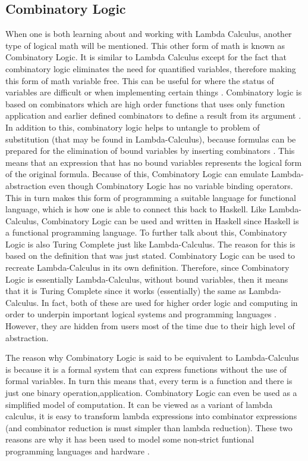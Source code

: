 \documentclass{article}
\begin{document}
\subsection{Combinatory Logic}
When one is both learning about and working with Lambda Calculus, another type of logical math will be mentioned.
This other form of math is known as Combinatory Logic.
It is similar to Lambda Calculus except for the fact that combinatory logic eliminates the need for quantified variables, therefore making this form of math variable free. This can be useful for where the status of variables are difficult or when implementing certain things \cite{14}.
Combinatory logic is based on combinators which are high order functions that uses only function application and earlier defined combinators to define a result from its argument \cite{14}.
In addition to this, combinatory logic helps to untangle to problem of substitution (that may be found in Lambda-Calculus), because formulas can be prepared for the elimination of bound variables by inserting combinators \cite{15}.
This means that an expression that has no bound variables represents the logical form of the original formula.
Because of this, Combinatory Logic can emulate Lambda-abstraction even though Combinatory Logic has no variable binding operators. This in turn makes this form of programming a suitable language for functional language, which is how one is able to connect this back to Haskell.
Like Lambda-Calculus, Combinatory Logic can be used and written in Haskell since Haskell is a functional programming language.
To further talk about this, Combinatory Logic is also Turing Complete just like Lambda-Calculus.
The reason for this is based on the definition that was just stated.
Combinatory Logic can be used to recreate Lambda-Calculus in its own definition.
Therefore, since Combinatory Logic is essentially Lambda-Calculus, without bound variables, then it means that it is Turing Complete since it works (essentially) the same as Lambda-Calculus.
In fact, both of these are used for higher order logic and computing in order to underpin important logical systems and programming languages \cite{16}.
However, they are hidden from users most of the time due to their high level of abstraction.

\medskip\noindent
The reason why Combinatory Logic is said to be equivalent to Lambda-Calculus is because it is a formal system that can express functions without the use of formal variables.
In turn this means that, every term is a function and there is just one binary operation,application.
Combinatory Logic can even be used as a simplified model of computation.
It can be viewed as a variant of lambda calculus, it is easy to transform lambda expressions into combinator expressions (and combinator reduction is must simpler than lambda reduction). These two reasons are why it has been used to model some non-strict funtional programming languages and hardware \cite{14}.
\end{document}
